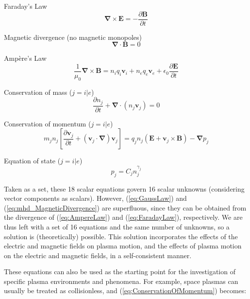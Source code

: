 \documentclass{article}
\begin{document}
Faraday's Law
\begin{equation}
    \mathbf \nabla \times \mathbf E = -\frac {\partial \mathbf B} {\partial t}
    \label{eq:FaradayLaw}
\end{equation}

Magnetic divergence (no magnetic monopoles)
\begin{equation}
  \mathbf \nabla \cdotp \mathbf B = 0
  \label{eq:mhd_MagneticDivergence}
\end{equation}

Amp\`{e}re's Law
\begin{equation}
    \frac {1} {\mu_0} \mathbf \nabla \times \mathbf B = n_i q_i \mathbf v_i + n_e q_e \mathbf v_e + \epsilon_0 \frac {\partial \mathbf E} {\partial t}
    \label{eq:AmpereLaw}
\end{equation}

Conservation of mass ($j = i|e$)
\begin{equation}
    \frac {\partial n_j} {\partial t} + \mathbf \nabla \cdotp \left(n_j \mathbf v_j \right) = 0
    \label{eq:ConservationOfMass}
\end{equation}

Conservation of momentum ($j = i|e$)
\begin{equation}
  m_j n_j \left[ \frac {\partial \mathbf v_j} {\partial t} + \left( \mathbf v_j \cdotp \mathbf \nabla \right) \mathbf v_j \right] = q_j n_j \left(\mathbf E + \mathbf v_j \times \mathbf B \right) - \mathbf \nabla p_j
  \label{eq:ConservationOfMomentum}
\end{equation}

Equation of state ($j = i|e$)
\begin{equation}
    p_j = C_j n_j^{\gamma_j}
    \label{eq:EquationOfState}
\end{equation}

Taken as a set, these 18 scalar equations govern 16 scalar unknowns (considering vector components as scalars). However, (\ref{eq:GaussLaw}) and (\ref{eq:mhd_MagneticDivergence}) are superfluous, since they can be obtained from the divergence of (\ref{eq:AmpereLaw}) and (\ref{eq:FaradayLaw}), respectively. We are thus left with a set of 16 equations and the same number of unknowns, so a solution is (theoretically) possible. This solution incorporates the effects of the electric and magnetic fields on plasma motion, and the effects of plasma motion on the electric and magnetic fields, in a self-consistent manner.

These equations can also be used as the starting point for the investigation of specific plasma environments and phenomena. For example, space plasmas can usually be treated as collisionless, and (\ref{eq:ConservationOfMomentum}) becomes:
\end{document}

